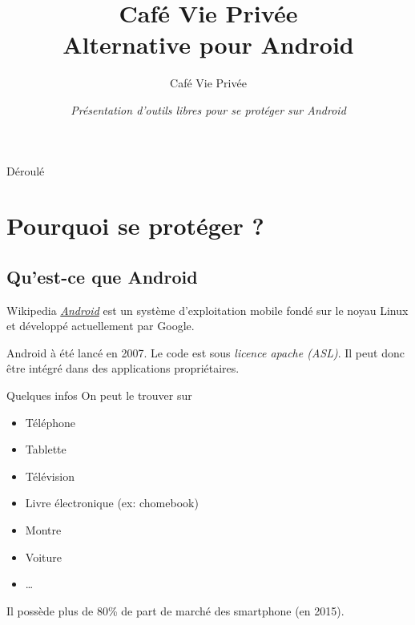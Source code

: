 \documentclass[aspectratio=169]{beamer}
\title[U-Boot]{Café Vie Privée \\ \textbf{Alternative pour Android}}
\author[Café Vie Privée]{Café Vie Privée}
\date[Août 2018]{\textit{Présentation d'outils libres pour se protéger sur Android}}
\begin{document}

\begin{frame}
\titlepage
\end{frame}



\begin{frame}{Déroulé}
\tableofcontents[hideallsubsections]
\end{frame}

\section{Pourquoi se protéger ?}

\begin{frame}
\begin{center}
\huge{\color{cvp}{Pourquoi se protéger ?}}
\end{center}
\end{frame}

\subsection{Qu'est-ce que Android}

\begin{frame}{}
\begin{block}{Wikipedia}
	\emph{\href{https://fr.wikipedia.org/wiki/Android}{Android}} est un système d'exploitation mobile fondé sur le noyau Linux et développé actuellement par Google.
\end{block}
Android à été lancé en 2007.\newline
Le code est sous \emph{licence apache (ASL)}. Il peut donc être intégré dans des applications propriétaires.
\end{frame}

\begin{frame}{Quelques infos}
On peut le trouver sur
\begin{itemize}
	\item Téléphone
	\item Tablette
	\item Télévision
	\item Livre électronique (ex: chomebook)
	\item Montre
	\item Voiture
	\item …
\end{itemize}
Il possède plus de 80\% de part de marché des smartphone (en 2015).
\end{frame}
\end{document}
